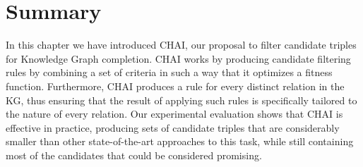 \section{Summary}\label{sec:chai-summary}
In this chapter we have introduced CHAI, our proposal to filter candidate triples for Knowledge Graph completion. CHAI works by producing candidate filtering rules by combining a set of criteria in such a way that it optimizes a fitness function. Furthermore, CHAI produces a rule for every distinct relation in the KG, thus ensuring that the result of applying such rules is specifically tailored to the nature of every relation. Our experimental evaluation shows that CHAI is effective in practice, producing sets of candidate triples that are considerably smaller than other state-of-the-art approaches to this task, while still containing most of the candidates that could be considered promising.